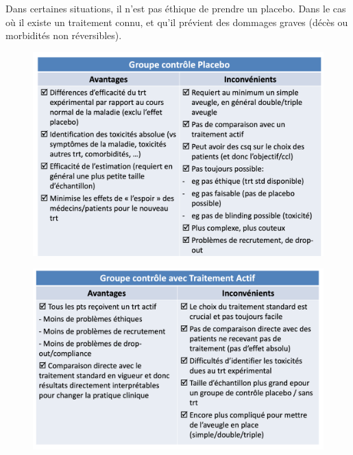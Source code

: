Dans certaines situations, il n'est pas éthique de prendre un placebo. Dans le cas où il existe un traitement connu, et qu'il prévient des dommages graves (décès ou morbidités non réversibles).

\begin{figure}[H]
    \centering
    \includegraphics[scale=0.3]{images/placebo.png}
    \caption{}
    \label{fig:my_label}
\end{figure}

\begin{figure}[H]
    \centering
    \includegraphics[scale=0.3]{images/actif_treatment.png}
    \caption{}
    \label{fig:my_label}
\end{figure}


